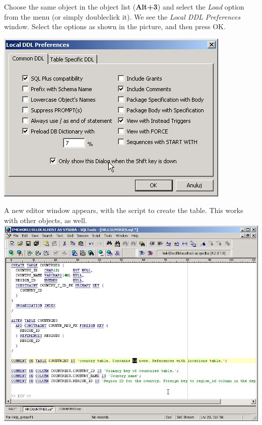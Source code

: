 \documentclass[a4paper,titlepage]{article}
\begin{document}
Choose the same object in the object list (\textbf{Alt+3}) and select the \emph{Load} option from the menu (or simply doubleclick it). We see the \emph{Local DDL Preferences} window.  Select the options as shown in the picture, and then press OK.
\begin{center}
\includegraphics[bb=0 0 425 313,scale=.7]{02objview01}
\end{center}

A new editor window appears, with the script to create the table.  This works with other objects, as well.\\
\includegraphics[bb=0 0 807 622,width=\textwidth]{02objview03}
\end{document}

